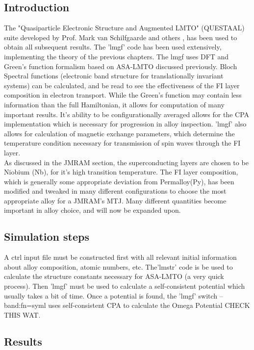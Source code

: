 \documentclass[12pt]{article}
\begin{document}
\subsection{Introduction}

The "Quasiparticle Electronic Structure and Augmented LMTO" (QUESTAAL) suite developed by Prof. Mark van Schilfgaarde and others \cite{ques}, has been used to obtain all subsequent results. The 'lmgf' code has been used extensively, implementing the theory of the previous chapters. The lmgf uses DFT and Green’s function formalism based on ASA-LMTO discussed previously. Bloch Spectral functions (electronic band structure for translationally invariant systems) can be calculated, and be read to see the effectiveness of the FI layer composition in electron transport. While the Green's function may contain less information than the full Hamiltonian, it allows for computation of many important results. It's ability to be configurationally averaged allows for the CPA implementation which is necessary for progression in alloy inspection. 'lmgf' also allows for calculation of magnetic exchange parameters, which determine the temperature condition necessary for transmission of spin waves through the FI layer. 
\\
As discussed in the JMRAM section, the superconducting layers are chosen to be Niobium (Nb), for it's high transition temperature. The FI layer composition, which is generally some appropriate deviation from Permalloy(Py), has been modified and tweaked in many different configurations to choose the most appropriate alloy for a JMRAM's MTJ. Many different quantities become important in alloy choice, and will now be expanded upon.

\subsection{Simulation steps}

A ctrl input file must be constructed first with all relevant initial information about alloy composition, atomic numbers, etc.
The'lmstr' code is be used to calculate the structure constants necessary for ASA-LMTO (a very quick process). Then 'lmgf' must be used to calculate a self-consistent potential which usually takes a bit of time. Once a potential is found, the 'lmgf' switch --band:fn=syml uses self-consistent CPA to calculate the Omega Potential CHECK THIS WAT. 

\clearpage
\subsection{Results}
\end{document}
